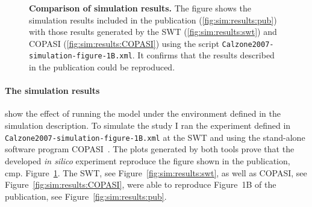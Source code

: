 \begin{figure}
\begin{center}
{\begin{minipage}[b]{.25\textwidth}
\end{minipage}
\label{fig:sim:results:swt}
}
\end{center}
\caption{\textbf{Comparison of simulation results.} The figure shows the simulation results included in the publication (\ref{fig:sim:results:pub}) with those results generated by the SWT (\ref{fig:sim:results:swt}) and COPASI (\ref{fig:sim:results:COPASI}) using the \sedml script \texttt{Calzone2007-simulation-figure-1B.xml}. It confirms that the results described in the publication could be reproduced.}
\label{fig:sim:results}
\end{figure}

\paragraph{The simulation results} show the effect of running the model under the environment defined in the simulation description.
To simulate the study I ran the experiment defined in \texttt{Calzone2007-simulation-figure-1B.xml} at the SWT and using the stand-alone software program COPASI~\cite{copasi}.
The plots generated by both tools prove that the developed \textit{in silico} experiment reproduce the figure shown in the publication, cmp. Figure~\ref{fig:sim:results}.
The SWT, see Figure~\ref{fig:sim:results:swt}, as well as COPASI, see Figure~\ref{fig:sim:results:COPASI}, were able to reproduce Figure~1B of the publication, see Figure~\ref{fig:sim:results:pub}.

